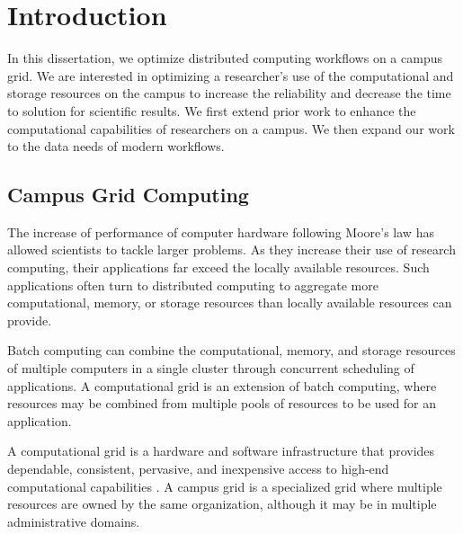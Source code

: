\chapter{Introduction}

In this dissertation, we optimize distributed computing workflows on a campus grid.  We are interested in optimizing a researcher's use of the computational and storage resources on the campus to increase the reliability and decrease the time to solution for scientific results.  We first extend prior work to enhance the computational capabilities of researchers on a campus.  We then expand our work to the data needs of modern workflows.

\section{Campus Grid Computing}

The increase of performance of computer hardware following Moore's law \cite{schaller1997moore} has allowed scientists to tackle larger problems.  As they increase their use of research computing, their applications far exceed the locally available resources.  Such applications often turn to distributed computing to aggregate more computational, memory, or storage resources than locally available resources can provide.


Batch computing can combine the computational, memory, and storage resources of multiple computers in a single cluster through concurrent scheduling of applications.  A computational grid is an extension of batch computing, where resources may be combined from multiple pools of resources to be used for an application.

A computational grid is a hardware and software infrastructure that provides dependable, consistent, pervasive, and inexpensive access to high-end computational capabilities \cite{foster2004grid}.  A campus grid is a specialized grid where multiple resources are owned by the same organization, although it may be in multiple administrative domains.  

